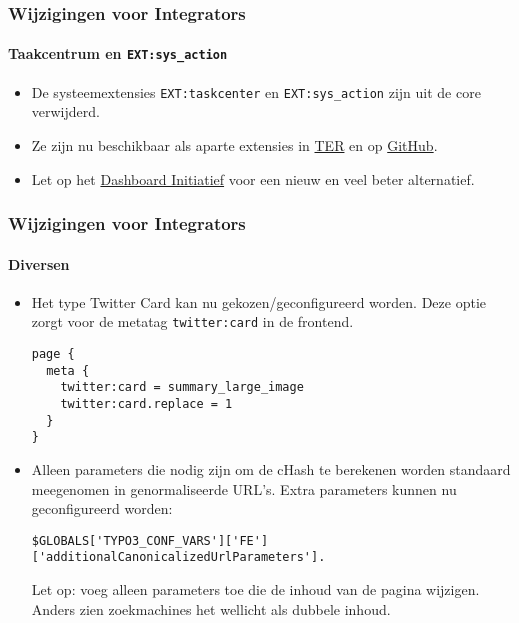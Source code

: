
\begin{frame}[fragile]
	\frametitle{Wijzigingen voor Integrators}
	\framesubtitle{Taakcentrum en \texttt{EXT:sys\_action}}

	\begin{itemize}

		\item De systeemextensies \texttt{EXT:taskcenter} en \texttt{EXT:sys\_action}
			zijn uit de core verwijderd.

		\item Ze zijn nu beschikbaar als aparte extensies in
			\href{https://extensions.typo3.org/}{TER}
			en op
			\href{https://github.com/FriendsOfTYPO3}{GitHub}.

		\item Let op het
			\href{https://typo3.org/community/teams/typo3-development/initiatives/typo3-dashboard-initiative/}{Dashboard Initiatief}
			voor een nieuw en veel beter alternatief.

	\end{itemize}

\end{frame}


\begin{frame}[fragile]
	\frametitle{Wijzigingen voor Integrators}
	\framesubtitle{Diversen}

	\lstset{basicstyle=\tiny\ttfamily}

	\begin{itemize}

		\item Het type Twitter Card kan nu gekozen/geconfigureerd worden.
			Deze optie zorgt voor de metatag \texttt{twitter:card} in de frontend.

\begin{lstlisting}
page {
  meta {
    twitter:card = summary_large_image
    twitter:card.replace = 1
  }
}
\end{lstlisting}

		\item Alleen parameters die nodig zijn om de cHash te berekenen worden standaard meegenomen in genormaliseerde URL's.
			Extra parameters kunnen nu geconfigureerd worden:

\begin{lstlisting}
$GLOBALS['TYPO3_CONF_VARS']['FE']['additionalCanonicalizedUrlParameters'].
\end{lstlisting}

		\smaller
			Let op: voeg alleen parameters toe die de inhoud van de pagina wijzigen. Anders zien zoekmachines het wellicht als dubbele inhoud.
		\normalsize

	\end{itemize}

\end{frame}

